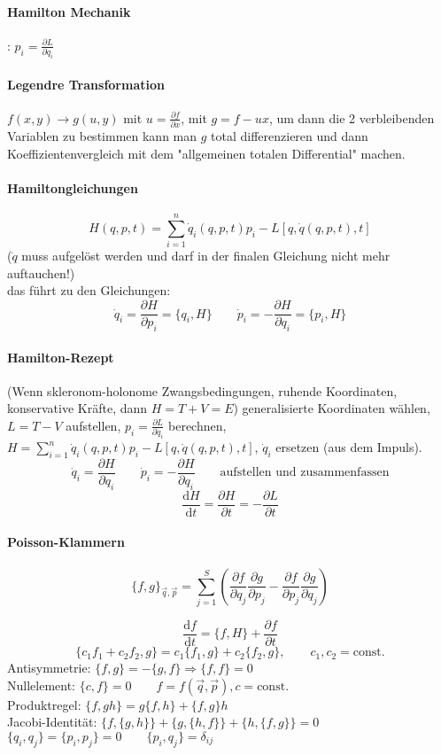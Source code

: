 \documentclass[a4paper, 11pt, fleqn]{article}
\renewcommand{\vec}{\overrightarrow}
\newcommand{\const}{\mathrm{const.}}
\newcommand{\md}{\mathrm{d}}
\newcommand{\pd}[2]{\frac{\partial #1}{\partial #2}}
\newcommand{\ad}[2]{\frac{\md #1}{\md #2}}
\begin{document}
\begin{multicols}{2}
\paragraph{Hamilton Mechanik}: $p_i = \pd{L}{\dot q_i}$
\paragraph{Legendre Transformation} $f(x,y) \to g(u,y)$ mit $u = \pd{f}{x} $, mit $g=f-ux$, um dann die 2 verbleibenden Variablen zu bestimmen kann man $g$ total differenzieren und dann Koeffizientenvergleich mit dem "allgemeinen totalen Differential" machen.

\paragraph{Hamiltongleichungen}
\[H(q,p,t) = \sum\limits_{i=1}^n\dot q_i(q,p,t)p_i-L[q,\dot q(q,p,t),t]\]
($\dot q$ muss aufgelöst werden und darf in der finalen Gleichung nicht mehr auftauchen!)\\
das führt zu den Gleichungen:
\[\dot q_i = \pd{H}{p_i} = \{q_i, H\} \qquad \dot p_i = -\pd{H}{q_i} = \{p_i, H\}\]
\paragraph{Hamilton-Rezept}
(Wenn skleronom-holonome Zwangsbedingungen, ruhende Koordinaten, konservative Kräfte, dann $H=T+V=E$)
generalisierte Koordinaten wählen, $L = T - V$ aufstellen, $p_i = \pd{L}{\dot q_i}$ berechnen, $H=\sum\limits_{i=1}^n\dot q_i(q,p,t)p_i-L[q,\dot q(q,p,t),t]$, $\dot q_i$ ersetzen (aus dem Impuls).
\[\dot q_i = \pd{H}{q_i} \qquad \dot p_i = -\pd{H}{q_i} \qquad \text{aufstellen und zusammenfassen}\]
\[\ad{H}{t}=\pd{H}{t} =-\pd{L}{t}\]

\paragraph{Poisson-Klammern}
\[\{f,g\}_{\vec q, \vec p} = \sum\limits_{j=1}^S \left(\frac{\partial f}{\partial q_j}\frac{\partial g}{\partial p_j} - \frac{\partial f}{\partial p_j}\frac{\partial g}{\partial q_j} \right)\]

\[\ad{f}{t} = \{f,H\} + \pd{f}{t}\]
\[\{c_1f_1+c_2f_2,g\} = c_1\{f_1,g\} + c_2\{f_2,g\}, \qquad c_1,c_2=\const\]
Antisymmetrie: $\{f,g\} = -\{g,f\} \Rightarrow \{f,f\}=0$\\
Nullelement: $\{c,f\} = 0 \qquad f=f(\vec q, \vec p), c=\const$\\
Produktregel: $\{f,gh\} = g\{f,h\} + \{f,g\}h$\\
Jacobi-Identität: $\{f,\{g,h\}\} + \{g,\{h,f\}\} + \{h,\{f,g\}\} = 0$\\
$\{q_i,q_j\} = \{p_i,p_j\} = 0 \qquad \{p_i,q_j\} = \delta_{ij}$

\end{multicols}
\end{document}
